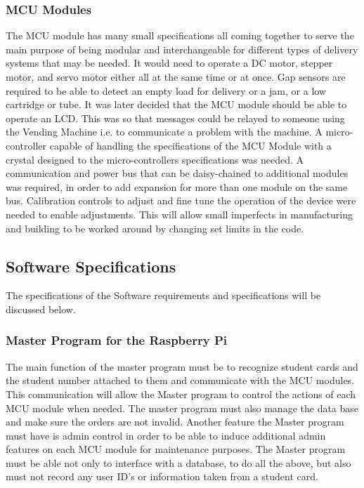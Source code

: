 \documentclass[a4paper,11pt]{article}
\numberwithin{figure}{section}
\numberwithin{table}{section}
\begin{document}
\subsubsection{MCU Modules}
The MCU module has many small specifications all coming together to serve the main purpose of being modular and interchangeable for different types of delivery systems that may be needed. It would need to operate a DC motor, stepper motor, and servo motor either all at the same time or at once. Gap sensors are required to be able to detect an empty load for delivery or a jam, or a low cartridge or tube. It was later decided that the MCU module should be able to operate an LCD. This was so that messages could be relayed to someone using the Vending Machine i.e. to communicate a problem with the machine. A micro-controller capable of handling the specifications of the MCU Module with a crystal designed to the micro-controllers specifications was needed. A communication and power bus that can be daisy-chained to additional modules was required, in order to add expansion for more than one module on the same bus. Calibration controls to adjust and fine tune the operation of the device were needed to enable adjustments. This will allow small imperfects in manufacturing and building to be worked around by changing set limits in the code.
\subsection{Software Specifications}
The specifications of the Software requirements and specifications will be discussed below.
\subsubsection{Master Program for the Raspberry Pi}
The main function of the master program must be to recognize student cards and the student number attached to them and communicate with the MCU modules. This communication will allow the Master program to control the actions of each MCU module when needed. The master program must also manage the data base and make sure the orders are not invalid. Another feature the Master program must have is admin control in order to be able to induce additional admin features on each MCU module for maintenance purposes. The Master program must be able not only to interface with a database, to do all the above, but also must not record any user ID's or information taken from a student card.
\end{document}

